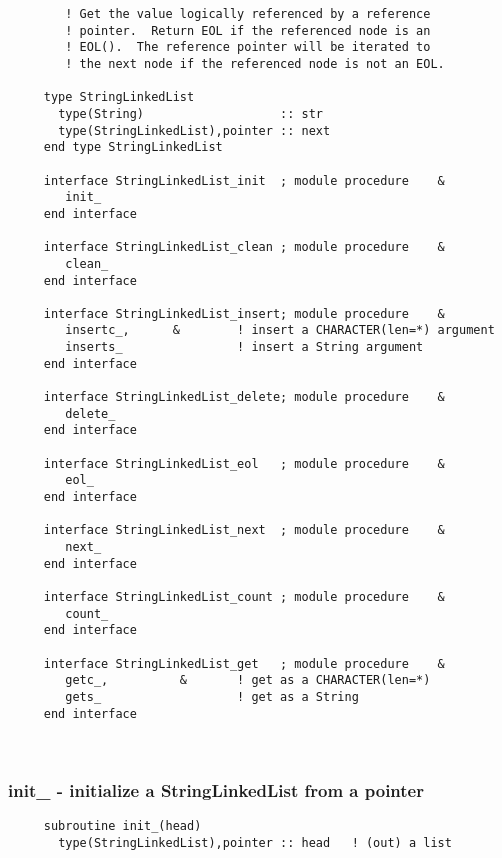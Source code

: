 \begin{verbatim}
 		! Get the value logically referenced by a reference
 		! pointer.  Return EOL if the referenced node is an
 		! EOL().  The reference pointer will be iterated to
 		! the next node if the referenced node is not an EOL.
 
     type StringLinkedList
       type(String)                   :: str
       type(StringLinkedList),pointer :: next
     end type StringLinkedList
 
     interface StringLinkedList_init  ; module procedure	&
        init_
     end interface
 
     interface StringLinkedList_clean ; module procedure	&
        clean_
     end interface
 
     interface StringLinkedList_insert; module procedure	&
        insertc_,      &        ! insert a CHARACTER(len=*) argument
        inserts_                ! insert a String argument
     end interface
 
     interface StringLinkedList_delete; module procedure	&
        delete_
     end interface
 
     interface StringLinkedList_eol   ; module procedure	&
        eol_
     end interface
 
     interface StringLinkedList_next  ; module procedure	&
        next_
     end interface
 
     interface StringLinkedList_count ; module procedure	&
        count_
     end interface
 
     interface StringLinkedList_get   ; module procedure	&
        getc_,          &       ! get as a CHARACTER(len=*)
        gets_                   ! get as a String
     end interface
 \end{verbatim}%
 
 
\mbox{}\hrulefill\ 
 

  \subsubsection{init\_ - initialize a StringLinkedList from a pointer}

\begin{verbatim} 
     subroutine init_(head)
       type(StringLinkedList),pointer :: head	! (out) a list
 \end{verbatim}%
 
